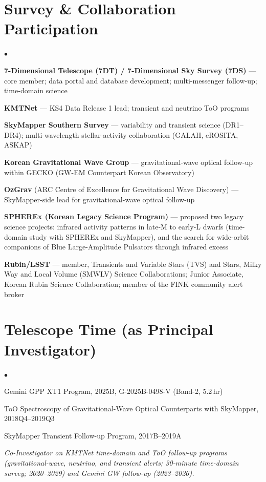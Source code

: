 \documentclass[letterpaper,11pt]{article}
\newenvironment{cvitemize}{
  \begin{list}{$\bullet$}{
    \setlength{\leftmargin}{1.5em}
    \setlength{\itemsep}{0.2em}
    \setlength{\parsep}{0em}
  }
}{
  \end{list}
}
\begin{document}
\section*{Survey \& Collaboration Participation}
\begin{cvitemize}
\item \textbf{7-Dimensional Telescope (7DT) / 7-Dimensional Sky Survey (7DS)} ---
core member; data portal and database development; multi-messenger follow-up; time-domain
science
\item \textbf{KMTNet} --- KS4 Data Release 1 lead; transient and neutrino ToO programs
\item \textbf{SkyMapper Southern Survey} --- variability and transient science (DR1--DR4);
multi-wavelength stellar-activity collaboration (GALAH, eROSITA, ASKAP)
\item \textbf{Korean Gravitational Wave Group} --- gravitational-wave optical follow-up within GECKO (GW-EM Counterpart Korean Observatory)
\item \textbf{OzGrav} (ARC Centre of Excellence for Gravitational Wave Discovery) ---
SkyMapper-side lead for gravitational-wave optical follow-up
\item \textbf{SPHEREx (Korean Legacy Science Program)} --- proposed two legacy science
      projects: infrared activity patterns in late-M to early-L dwarfs (time-domain study
      with SPHEREx and SkyMapper), and the search for wide-orbit companions of Blue
      Large-Amplitude Pulsators through infrared excess
\item \textbf{Rubin/LSST}  --- member, Transients and Variable Stars (TVS) and
      Stars, Milky Way and Local Volume (SMWLV) Science Collaborations; Junior Associate,
      Korean Rubin Science Collaboration; member of the FINK community alert broker
\end{cvitemize}

\section*{Telescope Time (as Principal Investigator)}
\begin{cvitemize}
\item Gemini GPP XT1 Program, 2025B, G-2025B-0498-V (Band-2, 5.2\,hr)
\item ToO Spectroscopy of Gravitational-Wave Optical Counterparts with SkyMapper,
2018Q4--2019Q3
\item SkyMapper Transient Follow-up Program, 2017B--2019A
\end{cvitemize}
\emph{Co-Investigator on KMTNet time-domain and ToO follow-up programs (gravitational-wave,
neutrino, and transient alerts; 30-minute time-domain survey; 2020--2029) and Gemini
GW follow-up (2023--2026).}
\end{document}
